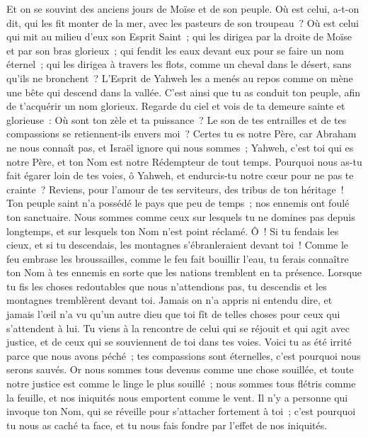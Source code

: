 \begin{multicols}{2}
Et on se souvint des anciens jours de Moïse et de son peuple. Où est celui, a-t-on dit, qui les fit monter de la mer, avec les pasteurs de son troupeau~? Où est celui qui mit au milieu d'eux son Esprit Saint~;
qui les dirigea par la droite de Moïse et par son bras glorieux~; qui fendit les eaux devant eux pour se faire un nom éternel~;
qui les dirigea à travers les flots, comme un cheval dans le désert, sans qu'ils ne bronchent~?
L'Esprit de Yahweh les a menés au repos comme on mène une bête qui descend dans la vallée. C'est ainsi que tu as conduit ton peuple, afin de t'acquérir un nom glorieux.
Regarde du ciel et vois de ta demeure sainte et glorieuse~: Où sont ton zèle et ta puissance~? Le son de tes entrailles et de tes compassions se retiennent-ils envers moi~?
Certes tu es notre Père, car Abraham ne nous connaît pas, et Israël ignore qui nous sommes~; Yahweh, c'est toi qui es notre Père, et ton Nom est notre Rédempteur de tout temps.
Pourquoi nous as-tu fait égarer loin de tes voies, ô Yahweh, et endurcis-tu notre cœur pour ne pas te crainte~? Reviens, pour l'amour de tes serviteurs, des tribus de ton héritage~!
Ton peuple saint n'a possédé le pays que peu de temps~; nos ennemis ont foulé ton sanctuaire.
Nous sommes comme ceux sur lesquels tu ne domines pas depuis longtemps, et sur lesquels ton Nom n'est point réclamé. Ô~! Si tu fendais les cieux, et si tu descendais, les montagnes s'ébranleraient devant toi~!
\VerseOne{}Comme le feu embrase les broussailles, comme le feu fait bouillir l'eau, tu ferais connaître ton Nom à tes ennemis en sorte que les nations tremblent en ta présence.
Lorsque tu fis les choses redoutables que nous n'attendions pas, tu descendis et les montagnes tremblèrent devant toi.
Jamais on n'a appris ni entendu dire, et jamais l'œil n'a vu qu'un autre dieu que toi fît de telles choses pour ceux qui s'attendent à lui.
Tu viens à la rencontre de celui qui se réjouit et qui agit avec justice, et de ceux qui se souviennent de toi dans tes voies. Voici tu as été irrité parce que nous avons péché~; tes compassions sont éternelles, c'est pourquoi nous serons sauvés.
Or nous sommes tous devenus comme une chose souillée, et toute notre justice est comme le linge le plus souillé~; nous sommes tous flétris comme la feuille, et nos iniquités nous emportent comme le vent.
Il n'y a personne qui invoque ton Nom, qui se réveille pour s'attacher fortement à toi~; c'est pourquoi tu nous as caché ta face, et tu nous fais fondre par l'effet de nos iniquités.

\end{multicols}
